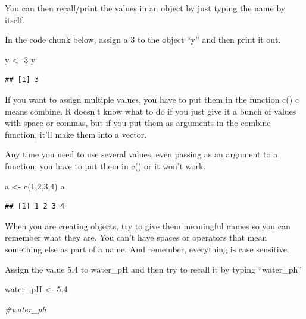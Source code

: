 \documentclass[
]{book}
\newenvironment{Shaded}{\begin{snugshade}}{\end{snugshade}}
\newcommand{\CommentTok}[1]{\textcolor[rgb]{0.56,0.35,0.01}{\textit{#1}}}
\newcommand{\DecValTok}[1]{\textcolor[rgb]{0.00,0.00,0.81}{#1}}
\newcommand{\FloatTok}[1]{\textcolor[rgb]{0.00,0.00,0.81}{#1}}
\newcommand{\FunctionTok}[1]{\textcolor[rgb]{0.00,0.00,0.00}{#1}}
\newcommand{\NormalTok}[1]{#1}
\newcommand{\OtherTok}[1]{\textcolor[rgb]{0.56,0.35,0.01}{#1}}
\begin{document}
You can then recall/print the values in an object by just typing the name by itself.

In the code chunk below, assign a 3 to the object ``y'' and then print it out.

\begin{Shaded}
\begin{Highlighting}[]
\NormalTok{y }\OtherTok{\textless{}{-}} \DecValTok{3}
\NormalTok{y}
\end{Highlighting}
\end{Shaded}

\begin{verbatim}
## [1] 3
\end{verbatim}

If you want to assign multiple values, you have to put them in the function c() c means combine. R doesn't know what to do if you just give it a bunch of values with space or commas, but if you put them as arguments in the combine function, it'll make them into a vector.

Any time you need to use several values, even passing as an argument to a function, you have to put them in c() or it won't work.

\begin{Shaded}
\begin{Highlighting}[]
\NormalTok{a }\OtherTok{\textless{}{-}} \FunctionTok{c}\NormalTok{(}\DecValTok{1}\NormalTok{,}\DecValTok{2}\NormalTok{,}\DecValTok{3}\NormalTok{,}\DecValTok{4}\NormalTok{)}
\NormalTok{a}
\end{Highlighting}
\end{Shaded}

\begin{verbatim}
## [1] 1 2 3 4
\end{verbatim}

When you are creating objects, try to give them meaningful names so you can remember what they are. You can't have spaces or operators that mean something else as part of a name. And remember, everything is case sensitive.

Assign the value 5.4 to water\_pH and then try to recall it by typing ``water\_ph''

\begin{Shaded}
\begin{Highlighting}[]
\NormalTok{water\_pH }\OtherTok{\textless{}{-}} \FloatTok{5.4}

\CommentTok{\#water\_ph}
\end{Highlighting}
\end{Shaded}
\end{document}
